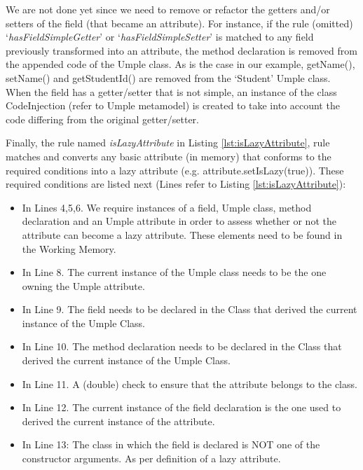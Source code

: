 We are not done yet since we need to remove or refactor the getters  and/or setters of the field (that became an attribute). For instance, if the rule (omitted) `\textit{hasFieldSimpleGetter}' or `\textit{hasFieldSimpleSetter}' is matched to any field previously transformed into an attribute, the method declaration is removed from the appended code of the Umple class. As is the case in our example, getName(), setName() and getStudentId() are removed from the `Student' Umple class.
When the field has a getter/setter that is not simple, an instance of the class CodeInjection (refer to Umple metamodel) is created to take into account the code differing from the original getter/setter.

Finally, the rule named \textit{isLazyAttribute} in Listing \ref{lst:isLazyAttribute},  rule matches and converts any basic attribute (in memory) that conforms to the required conditions into a lazy attribute (e.g. attribute.setIsLazy(true)). These required conditions are listed next (Lines refer to Listing \ref{lst:isLazyAttribute}): 

\begin{itemize} 
\item In Lines 4,5,6. We require instances of a field, Umple class, method declaration and an Umple attribute in order to assess whether or not the attribute can become a lazy attribute. These elements need to be found in the Working Memory. 
\item In Line 8. The current instance of the Umple class needs to be the one owning the Umple attribute.
\item In Line 9. The field needs to be declared in the Class that derived the current instance of the Umple Class.
\item In Line 10. The method declaration needs to be declared in the Class that derived the current instance of the Umple Class.
\item In Line 11. A (double) check to ensure that the attribute belongs to the class.
\item In Line 12. The current instance of the field declaration is the one used to derived the current instance of the attribute.
\item In Line 13: The class in which the field is declared is NOT one of the constructor arguments. As per definition of a lazy attribute.
\end{itemize}

